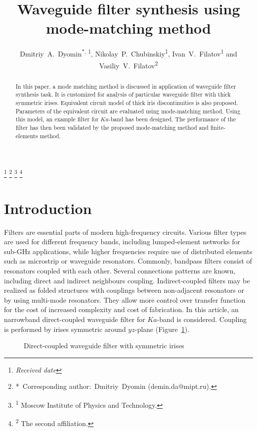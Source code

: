 \documentclass{pj}
\begin{document}
\setcounter{page}{1}

\title
{Waveguide filter synthesis using mode-matching method}
\footnote{\it Received date}
\footnote{\hskip-0.12in*\, Corresponding author:~Dmitriy~Dyomin (demin.da@mipt.ru).}
\footnote{\hskip-0.12in\textsuperscript{1} Moscow Institute of Physics
  and Technology.}
\footnote{\hskip-0.12in\textsuperscript{2} The second affiliation.}

\author{
  Dmitriy~A.~Dyomin\textsuperscript{*, 1},
  Nikolay~P.~Chubinskiy\textsuperscript{1},
  Ivan~V.~Filatov\textsuperscript{1} and
  Vasiliy~V.~Filatov\textsuperscript{2}}

\begin{abstract}
  In this paper, a mode matching method is discussed in application of
  waveguide filter synthesis task. It is customized for analysis of
  particular waveguide filter with thick symmetric irises. Equivalent
  circuit model of thick iris discontinuities is also
  proposed. Parameters of the equivalent circuit are evaluated using
  mode-matching method. Using this model, an example filter for
  $Ka$-band has been designed. The performance of the filter has then
  been validated by the proposed mode-matching method and
  finite-elements method.
\end{abstract}

\section{Introduction}
\label{sec:introduction}

Filters are essential parts of modern high-frequency circuits.
Various filter types are used for different frequency bands, including
lumped-element networks for sub-GHz applications, while higher
frequencies require use of distributed elements such as microstrip or
waveguide resonators. Commonly, bandpass filters consist of resonators
coupled with each other. Several connections patterns are known,
including direct and indirect neighbours coupling. Indirect-coupled
filters may be realized as folded structures with couplings between
non-adjacent resonators or by using multi-mode resonators. They allow
more control over transfer function for the cost of increased
complexity and cost of fabrication. In this article, an narrowband
direct-coupled waveguide filter for $Ka$-band is considered. Coupling
is performed by irises symmetric around $yz$-plane
(Figure~\ref{fig:filter-drawing}).

\begin{figure}[h]
  \centering
  
  \caption{Direct-coupled waveguide filter with symmetric irises}
  \label{fig:filter-drawing}
\end{figure}
\end{document}
